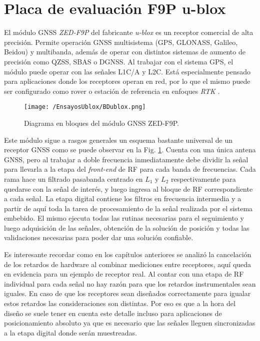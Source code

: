 \documentclass[a4paper,12pt,oneside,onecolumn,final,openright]{book}%
\begin{document}
\section{Placa de evaluación F9P u-blox}
	El módulo GNSS \textit{ZED-F9P} del fabricante \textit{u-blox} es un receptor comercial de alta precisión. Permite operación GNSS multisistema (GPS, GLONASS, Galileo, Beidou) y multibanda, además de operar con distintos sistemas de aumento de precisión como QZSS, SBAS o DGNSS. Al trabajar con el sistema GPS, el módulo puede operar con las señales L1C/A y L2C. Está especialmente pensado para aplicaciones donde los receptores operan en red, por lo que el mismo puede ser configurado como rover o estación de referencia en enfoques \textit{RTK} \cite{ZEDds}.

\begin{figure}
    \centering
    \texttt{[image: /EnsayosUblox/BDublox.png]}
    \caption{Diagrama en bloques del módulo GNSS ZED-F9P.}
    \label{fig:BDublox}
\end{figure}
	Este módulo sigue a rasgos generales un esquema bastante universal de un receptor GNSS como se puede observar en la Fig. \ref{fig:BDublox}. Cuenta con una única antena GNSS, pero al trabajar a doble frecuencia inmediatamente debe dividir la señal para llevarla a la etapa del \textit{front-end} de RF para cada banda de frecuencias. Cada rama hace un filtrado pasabanda centrado en $L_1$ y $L_2$ respectivamente para quedarse con la señal de interés, y luego ingresa al bloque de RF correspondiente a cada señal. La etapa digital contiene los filtros en frecuencia intermedia y a partir de aquí toda la tarea de procesamiento de la señal realizada por el sistema embebido. El mismo ejecuta todas las rutinas necesarias para el seguimiento y luego adquisición de las señales, obtención de la solución de posición y todas las validaciones necesarias para poder dar una solución confiable.
	
	Es interesante recordar como en los capítulos anteriores se analizó la cancelación de los retardos de hardware al combinar mediciones entre receptores, aquí queda en evidencia para un ejemplo de receptor real. Al contar con una etapa de RF individual para cada señal no hay razón para que los retardos instrumentales sean iguales. En caso de que los receptores sean diseñados correctamente para igualar estos retardos las consideraciones son distintas. Por eso es que a la hora del diseño se suele tener en cuenta este detalle incluso para aplicaciones de posicionamiento absoluto ya que es necesario que las señales lleguen sincronizadas a la etapa digital donde serán muestreadas. 
	
\end{document}
